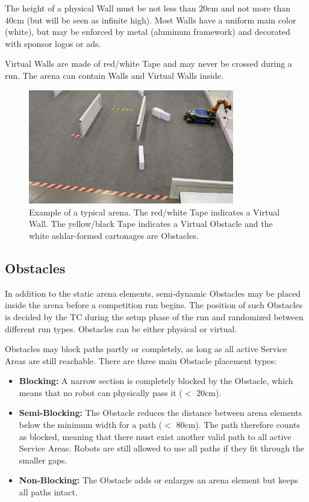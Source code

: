 The height of a physical Wall must be not less than $20\si{\centi\meter}$ and not more than $40\si{\centi\meter}$ (but will be seen as infinite high). Most Walls have a uniform main color (white), but may be enforced by metal (aluminum framework) and decorated with sponsor logos or ads.

Virtual Walls are made of red/white Tape and may never be crossed during a run. The arena can contain Walls and Virtual Walls inside.

\begin{figure} [h!]
\centering
\includegraphics[width= 0.8\textwidth ]{./images/general_rules/barrier_tapes_in_china15.jpg}
\caption{Example of a typical arena. The red/white Tape indicates a Virtual Wall. The yellow/black Tape indicates a Virtual Obstacle and the white ashlar-formed cartonages are Obstacles.}
\label{fig:walls_and_virt_walls}
\end{figure}

\subsection{Obstacles}
\label{subsec: Obstacles}

In addition to the static arena elements, semi-dynamic Obstacles may be placed inside the arena before a competition run begins. 
The position of such Obstacles is decided by the TC during the setup phase of the run and randomized between different run types. Obstacles can be either physical or virtual.

Obstacles may block paths partly or completely, as long as all active Service Areas are still reachable.
There are three main Obstacle placement types:

\begin{itemize}
\item \textbf{Blocking:} 
A narrow section is completely blocked by the Obstacle, which means that no robot can physically pass it ($<$ $20\si{\centi\meter}$).

\item \textbf{Semi-Blocking:} 
The Obstacle reduces the distance between arena elements below the minimum width for a path ($<$ $80\si{\centi\meter}$). The path therefore counts as blocked, meaning that there must exist another valid path to all active Service Areas. Robots are still allowed to use all paths if they fit through the smaller gaps.

\item \textbf{Non-Blocking:}
The Obstacle adds or enlarges an arena element but keeps all paths intact.
\end{itemize}


